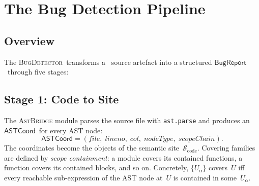 \documentclass[11pt]{article}
\newcommand{\BugRep}{\ensuremath{\mathsf{BugReport}}}          %
\newcommand{\BugDet}{\textsc{BugDetector}}        %
\newcommand{\SemSite}{\mathcal{S}_{\mathrm{code}}}%
\newcommand{\ASTCoord}{\ensuremath{\mathsf{ASTCoord}}}         %
\begin{document}
\section{The Bug Detection Pipeline}\label{sec:pipeline}

\subsection{Overview}

The \BugDet\ transforms a \Python\ source artefact into a structured
\BugRep\ through five stages:

\begin{center}
\end{center}

\subsection{Stage 1: Code to Site}

The \textsc{AstBridge} module parses the source file with
\texttt{ast.parse} and produces an \ASTCoord\ for every AST node:
\[
  \ASTCoord = (\mathit{file},\;\mathit{lineno},\;\mathit{col},
               \;\mathit{nodeType},\;\mathit{scopeChain}).
\]
The coordinates become the objects of the semantic site~$\SemSite$.
Covering families are defined by \emph{scope containment}: a module
covers its contained functions, a function covers its contained blocks,
and so on.  Concretely, $\{U_\alpha\}$ covers~$U$ iff every reachable
sub-expression of the AST node at~$U$ is contained in some~$U_\alpha$.
\end{document}
